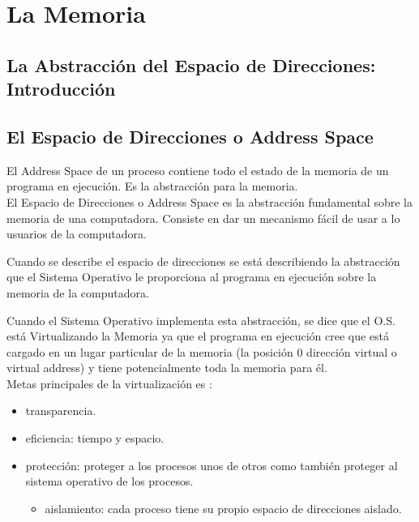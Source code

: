 \documentclass[../main.tex]{subfiles}
\begin{document}
\section{La Memoria}
    \subsection{La Abstracción del Espacio de Direcciones: Introducción}
    
    \subsection{El Espacio de Direcciones o Address Space}
        El Address Space de un proceso contiene todo el estado de la memoria de un programa en ejecución. Es la abstracción para la memoria.\\

        El Espacio de Direcciones o Address Space es la abstracción fundamental sobre la memoria de una computadora. Consiste en dar un mecanismo fácil de usar a lo usuarios de la computadora.

        Cuando se describe el espacio de direcciones se está describiendo la abstracción que el Sistema Operativo le proporciona al programa en ejecución sobre la memoria de la computadora.

        Cuando el Sistema Operativo implementa esta abstracción, se dice que el O.S. está Virtualizando la Memoria ya que el programa en ejecución cree que está cargado en un lugar particular de la memoria (la posición 0 dirección virtual o virtual address) y tiene potencialmente toda la memoria para él.\\
        
        Metas principales de la virtualización es :
        \begin{itemize}
            \item transparencia.
            \item eficiencia: tiempo y espacio.
            \item protección: proteger a los procesos unos de otros como también proteger al sistema operativo de los procesos.
                \begin{itemize}
                    \item aislamiento: cada proceso tiene su propio espacio de direcciones aislado.
                \end{itemize} 
        \end{itemize}
\end{document}
